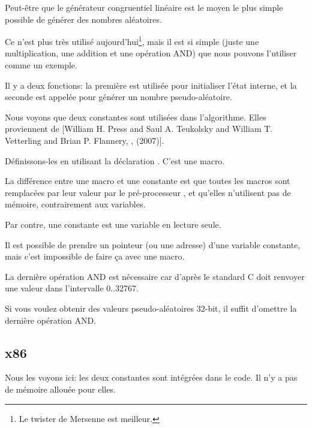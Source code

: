 \label{LCG_simple}

Peut-être que le générateur congruentiel linéaire est le moyen le plus simple possible
de générer des nombres aléatoires.

Ce n'est plus très utilisé aujourd'hui\footnote{Le twister de Mersenne est meilleur.},
mais il est si simple (juste une multiplication, une addition et une opération AND)
que nous pouvons l'utiliser comme un exemple.



Il y a deux fonctions: la première est utilisée pour initialiser l'état interne,
et la seconde est appelée pour générer un nombre pseudo-aléatoire.

Nous voyons que deux constantes sont utilisées dans l'algorithme.
Elles proviennent de
[William H. Press and Saul A. Teukolsky and William T. Vetterling and Brian P. Flannery, , (2007)].

Définissons-les en utilisant la déclaration \CCpp {}. C'est une macro.

La différence entre une macro \CCpp et une constante est que toutes les macros sont
remplacées par leur valeur par le pré-processeur \CCpp, et qu'elles n'utilisent pas
de mémoire, contrairement aux variables.

Par contre, une constante est une variable en lecture seule.

Il est possible de prendre un pointeur (ou une adresse) d'une variable constante,
mais c'est impossible de faire ça avec une macro.

La dernière opération AND est nécessaire car d'après le standard C 
doit renvoyer une valeur dans l'intervalle 0..32767.

Si vous voulez obtenir des valeurs pseudo-aléatoires 32-bit, il suffit d'omettre
la dernière opération AND.

\subsection{x86}



Nous les voyons ici: les deux constantes sont intégrées dans le code.
Il n'y a pas de mémoire allouée pour elles.

